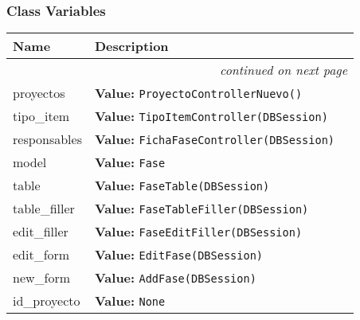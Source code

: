 
  \subsubsection{Class Variables}

    \vspace{-1cm}
\hspace{\varindent}\begin{longtable}{|p{\varnamewidth}|p{\vardescrwidth}|l}
\cline{1-2}
\cline{1-2} \centering \textbf{Name} & \centering \textbf{Description}& \\
\cline{1-2}
\endhead\cline{1-2}\multicolumn{3}{r}{\small\textit{continued on next page}}\\\endfoot\cline{1-2}
\endlastfoot\raggedright p\-r\-o\-y\-e\-c\-t\-o\-s\- & \raggedright \textbf{Value:} 
{\tt ProyectoControllerNuevo()}&\\
\cline{1-2}
\raggedright t\-i\-p\-o\-\_\-i\-t\-e\-m\- & \raggedright \textbf{Value:} 
{\tt TipoItemController(DBSession)}&\\
\cline{1-2}
\raggedright r\-e\-s\-p\-o\-n\-s\-a\-b\-l\-e\-s\- & \raggedright \textbf{Value:} 
{\tt FichaFaseController(DBSession)}&\\
\cline{1-2}
\raggedright m\-o\-d\-e\-l\- & \raggedright \textbf{Value:} 
{\tt Fase}&\\
\cline{1-2}
\raggedright t\-a\-b\-l\-e\- & \raggedright \textbf{Value:} 
{\tt FaseTable(DBSession)}&\\
\cline{1-2}
\raggedright t\-a\-b\-l\-e\-\_\-f\-i\-l\-l\-e\-r\- & \raggedright \textbf{Value:} 
{\tt FaseTableFiller(DBSession)}&\\
\cline{1-2}
\raggedright e\-d\-i\-t\-\_\-f\-i\-l\-l\-e\-r\- & \raggedright \textbf{Value:} 
{\tt FaseEditFiller(DBSession)}&\\
\cline{1-2}
\raggedright e\-d\-i\-t\-\_\-f\-o\-r\-m\- & \raggedright \textbf{Value:} 
{\tt EditFase(DBSession)}&\\
\cline{1-2}
\raggedright n\-e\-w\-\_\-f\-o\-r\-m\- & \raggedright \textbf{Value:} 
{\tt AddFase(DBSession)}&\\
\cline{1-2}
\raggedright i\-d\-\_\-p\-r\-o\-y\-e\-c\-t\-o\- & \raggedright \textbf{Value:} 
{\tt None}&\\
\cline{1-2}
\end{longtable}


